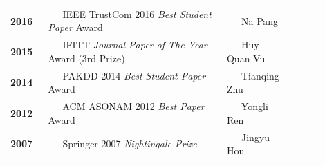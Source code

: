 \documentclass{tikzposter} %
\begin{document}
\begin{columns}
{{\begin{minipage}{\linewidth}
\begin{tabular}{ >{\centering}p{0.12\linewidth}  | p{0.58\linewidth} | p{0.2\linewidth}   r }
						\textbf{2016} & ~~~IEEE TrustCom 2016 \textit{Best Student Paper} Award & ~~~Na Pang &  \\
						
						\textbf{2015} & ~~~IFITT \textit{Journal Paper of The Year} Award (3rd Prize) & ~~~Huy Quan Vu &  \\
						
						\textbf{2014} & ~~~PAKDD 2014 \textit{Best Student Paper} Award & ~~~Tianqing Zhu &  \\
						
						\textbf{2012} & ~~~ACM ASONAM 2012  \textit{Best Paper} Award & ~~~Yongli Ren &  \\
						
						\textbf{2007} & ~~~Springer 2007 \textit{Nightingale Prize} & ~~~Jingyu Hou &  \\
						\bottomrule
					\end{tabular}
				\end{minipage}
			}		
		}
		
		
		
		
		
	\end{columns}
	
	
	
\end{document}
